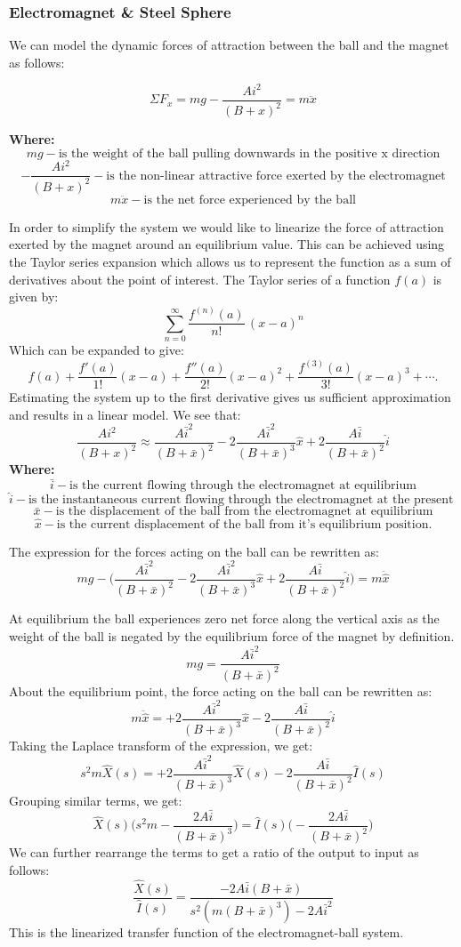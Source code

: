 \documentclass{article}
\theoremstyle{plain}
\theoremstyle{definition}
\theoremstyle{remark}
\begin{document}
\subsubsection*{Electromagnet \& Steel Sphere}
We can model the dynamic forces of attraction between the ball and the magnet as follows:

$$\Sigma F_x = mg - \frac{A i^2}{(B + x)^2} = m\ddot{x}$$

\textbf{Where:}
$$ mg - \text{is the weight of the ball pulling downwards in the positive x direction}$$
$$- \frac{A i^2}{(B + x)^2} - \text{is the non-linear attractive force exerted by the electromagnet}$$
$$ m\ddot{x} - \text{is the net force experienced by the ball}$$

In order to simplify the system we would like to linearize the force of attraction exerted by the magnet around an equilibrium value. This can be achieved using the Taylor series expansion which allows us to represent the function as a sum of derivatives about the point of interest. The Taylor series of a function $f(a)$ is given by:
$$\sum_{n=0}^{\infty} \frac {f^{(n)}(a)}{n!} \, (x-a)^{n}$$
Which can be expanded to give:
$$f(a)+\frac {f'(a)}{1!} (x-a)+ \frac{f''(a)}{2!} (x-a)^2+\frac{f^{(3)}(a)}{3!}(x-a)^3+ \cdots.$$
Estimating the system up to the first derivative gives us sufficient approximation and results in a linear model.  We see that:
$$\frac{A i^2}{(B + x)^2} \approx \frac{A \bar{i}^2}{(B + \bar{x})^2} - 2\frac{A \bar{i}^2}{(B + \bar{x})^3}\hat{x} + 2\frac{A \bar{i}}{(B + \bar{x})^2}\hat{i}$$
\textbf{Where:}
$$\bar{i}- \text{is the current flowing through the electromagnet at equilibrium}$$
$$\hat{i}- \text{is the instantaneous current flowing through the electromagnet at the present time}$$
$$\bar{x}- \text{is the displacement of the ball from the electromagnet at equilibrium}$$
$$\hat{x}- \text{is the current displacement of the ball from it's equilibrium position.}$$

The expression for the forces acting on the ball can be rewritten as:
$$mg - \Big( \frac{A \bar{i}^2}{(B + \bar{x})^2} - 2\frac{A \bar{i}^2}{(B + \bar{x})^3}\hat{x} + 2\frac{A \bar{i}}{(B + \bar{x})^2}\hat{i} \Big) = m\ddot{\hat{x}}$$

At equilibrium the ball experiences zero net force along the vertical axis as the weight of the ball is negated by the equilibrium force of the magnet by definition.
$$mg = \frac{A \bar{i}^2}{(B + \bar{x})^2} $$
About the equilibrium point, the force acting on the ball can be rewritten as:
$$m\ddot{\hat{x}} = + 2\frac{A \bar{i}^2}{(B + \bar{x})^3}\hat{x} - 2\frac{A \bar{i}}{(B + \bar{x})^2}\hat{i}$$
Taking the Laplace transform of the expression, we get:
$$s^2 m \hat{X}(s) = + 2\frac{A \bar{i}^2}{(B + \bar{x})^3}\hat{X}(s) - 2\frac{A \bar{i}}{(B + \bar{x})^2}\hat{I}(s)$$
Grouping similar terms, we get:
$$\hat{X}(s) \Big( s^2 m - \frac{2A\bar{i}}{(B + \bar{x})^3} \Big) = \hat{I}(s) \Big( - \frac{2A\bar{i}}{(B + \bar{x})^2}\Big)$$
We can further rearrange the terms to get a ratio of the output to input as follows:
$$\frac{\hat{X}(s)}{\hat{I}(s)} = \frac{-2 A \bar{i} (B + \bar{x})}{s^2 (m (B + \bar{x})^3) - 2 A\bar{i}^2}$$
This is the linearized transfer function of the electromagnet-ball system. \\
\end{document}
